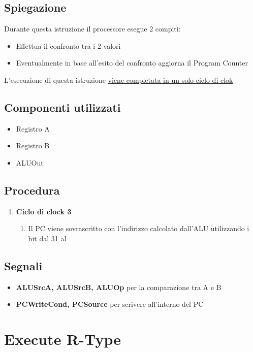 \subsection{Spiegazione}
Durante questa istruzione il processore esegue 2 compiti:
\begin{itemize}
    \item Effettua il confronto tra i 2 valori 
    \item Eventualmente in base all'esito del confronto aggiorna il Program Counter
\end{itemize}

L'esecuzione di questa istruzione \uline{viene completata in un solo ciclo di clok}

\subsection{Componenti utilizzati}
\begin{itemize}
    \item Registro A
    \item Registro B
    \item ALUOut
\end{itemize}

\subsection{Procedura}
\begin{enumerate}
    \item[3.] \textbf{Ciclo di clock 3}
        \begin{enumerate}[label=\theenumi.\arabic*]
            \item [3.1] Il PC viene sovrascritto con l'indirizzo calcolato dall'ALU utilizzando i bit dal 31 al 
        \end{enumerate}
\end{enumerate}

\subsection{Segnali}
\begin{itemize}
    \item \textbf{ALUSrcA, ALUSrcB, ALUOp} per la comparazione tra A e B
    \item \textbf{PCWriteCond, PCSource} per scrivere all'interno del PC
\end{itemize}

\newpage

\section{Execute R-Type}
